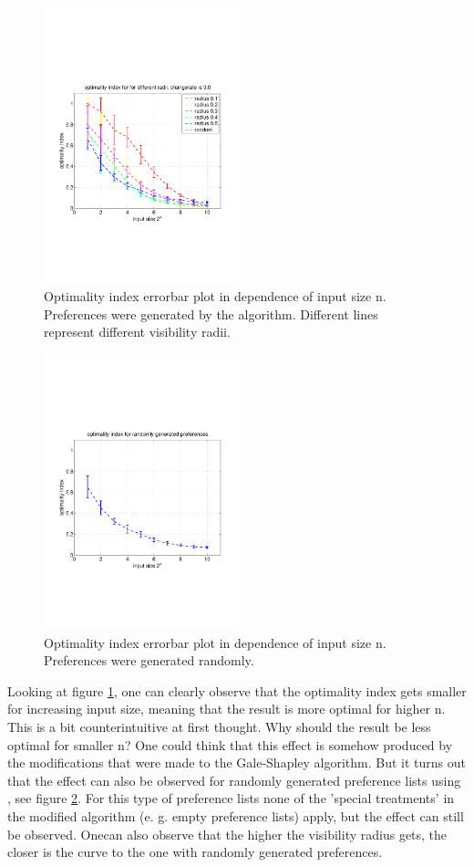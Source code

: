\documentclass[11pt]{article}
\begin{document}
\begin{figure}[h]
  \includegraphics[trim=0 180 0 180, clip, height=8cm]{../../code/data/2014_12_12_00_55_41/figure_1}
  \caption{Optimality index errorbar plot in dependence of input size n. Preferences were generated by the  algorithm. Different lines represent different visibility radii.}
  \label{fig:optimality1a}
\end{figure}
\begin{figure}[h]
  \includegraphics[trim=0 180 0 180, clip, height=8cm]{../../code/data/2014_12_12_00_55_41/figure_14}
  \caption{Optimality index errorbar plot in dependence of input size n. Preferences were generated randomly.}
  \label{fig:optimality1b}
\end{figure}

Looking at figure \ref{fig:optimality1a}, one can clearly observe that the optimality index gets smaller for increasing input size, meaning that
the result is more optimal for higher n. This is a bit counterintuitive at first thought. Why should the result be less optimal for smaller n?
One could think that this effect is somehow produced by the modifications that were made to the Gale-Shapley algorithm. But it turns
out that the effect can also be observed for randomly generated preference lists using , see figure \ref{fig:optimality1b}.
For this type of preference lists none of the 'special treatments' in the modified algorithm (e. g. empty preference lists) apply, but the
effect can still be observed. Onecan also observe that the higher the visibility radius gets, the closer is the curve to the one with randomly generated preferences.
\end{document}
